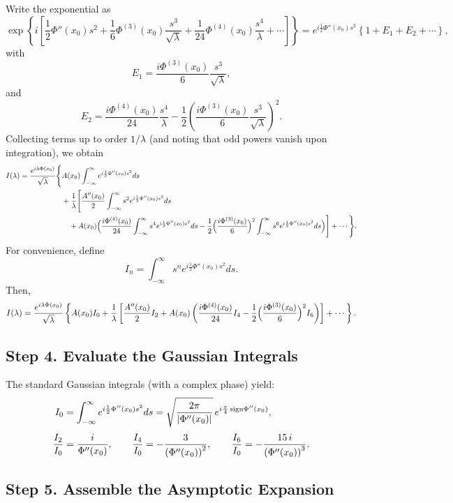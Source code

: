 \documentclass[11pt]{article}
\begin{document}
Write the exponential as
\[
\exp\left\{ i\left[\frac{1}{2}\Phi''(x_0)s^2+\frac{1}{6}\Phi^{(3)}(x_0)\frac{s^3}{\sqrt{\lambda}}+\frac{1}{24}\Phi^{(4)}(x_0)\frac{s^4}{\lambda}+\cdots\right] \right\} = e^{i\frac{1}{2}\Phi''(x_0)s^2}\left\{1+E_1+E_2+\cdots\right\},
\]
with
\[
E_1=\frac{i\Phi^{(3)}(x_0)}{6}\frac{s^3}{\sqrt{\lambda}},
\]
and
\[
E_2=\frac{i\Phi^{(4)}(x_0)}{24}\frac{s^4}{\lambda}-\frac{1}{2}\left(\frac{i\Phi^{(3)}(x_0)}{6}\frac{s^3}{\sqrt{\lambda}}\right)^2.
\]
Collecting terms up to order $1/\lambda$ (and noting that odd powers vanish upon integration), we obtain
\[
\begin{aligned}
I(\lambda)=\frac{e^{i\lambda\Phi(x_0)}}{\sqrt{\lambda}} \Biggl\{ &A(x_0) \int_{-\infty}^\infty e^{i\frac{1}{2}\Phi''(x_0)s^2}ds \\
&+\frac{1}{\lambda}\Biggl[\frac{A''(x_0)}{2}\int_{-\infty}^\infty s^2e^{i\frac{1}{2}\Phi''(x_0)s^2}ds \\
&\quad + A(x_0)\Bigl(\frac{i\Phi^{(4)}(x_0)}{24}\int_{-\infty}^\infty s^4e^{i\frac{1}{2}\Phi''(x_0)s^2}ds-\frac{1}{2}\Bigl(\frac{i\Phi^{(3)}(x_0)}{6}\Bigr)^2\int_{-\infty}^\infty s^6e^{i\frac{1}{2}\Phi''(x_0)s^2}ds\Bigr) \Biggr] +\cdots \Biggr\}.
\end{aligned}
\]
For convenience, define
\[
I_n=\int_{-\infty}^{\infty} s^n e^{i\frac{1}{2}\Phi''(x_0)s^2}ds.
\]
Then,
\[
I(\lambda)=\frac{e^{i\lambda\Phi(x_0)}}{\sqrt{\lambda}} \left\{ A(x_0)I_0 + \frac{1}{\lambda}\left[\frac{A''(x_0)}{2}I_2 + A(x_0)\left(\frac{i\Phi^{(4)}(x_0)}{24}I_4 -\frac{1}{2}\Bigl(\frac{i\Phi^{(3)}(x_0)}{6}\Bigr)^2I_6\right) \right] +\cdots \right\}.
\]

\subsection*{Step 4. Evaluate the Gaussian Integrals}

The standard Gaussian integrals (with a complex phase) yield:
\[
\begin{aligned}
I_0&=\int_{-\infty}^\infty e^{i\frac{1}{2}\Phi''(x_0)s^2}ds
=\sqrt{\frac{2\pi}{|\Phi''(x_0)|}}\,e^{i\frac{\pi}{4}\,\text{sign}\Phi''(x_0)},\\[1mm]
\frac{I_2}{I_0}&=\frac{i}{\Phi''(x_0)},\qquad
\frac{I_4}{I_0}=-\frac{3}{\left(\Phi''(x_0)\right)^2},\qquad
\frac{I_6}{I_0}=-\frac{15\,i}{\left(\Phi''(x_0)\right)^3}.
\end{aligned}
\]

\subsection*{Step 5. Assemble the Asymptotic Expansion}
\end{document}

